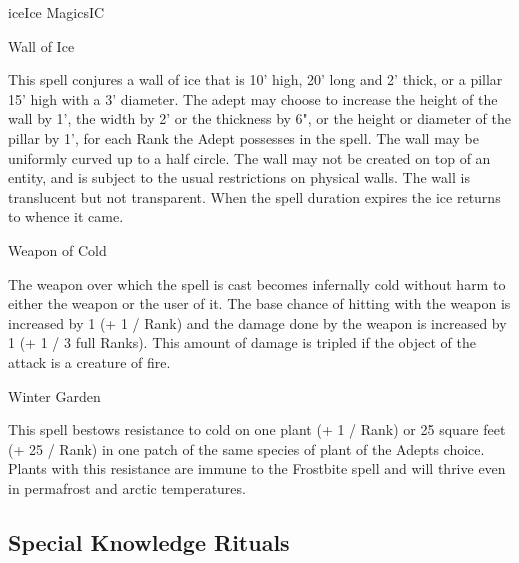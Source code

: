 \begin{college}[1.5]{ice}{Ice Magics}{IC}
\begin{spell}[S-15]{Wall of Ice}

\begin{effects}
This spell conjures a wall of ice that is 10' high, 20' long and 2'
thick, or a pillar 15' high with a 3' diameter.  The adept may choose
to increase the height of the wall by 1', the width by 2' or the
thickness by 6", or the height or diameter of the pillar by 1', for
each Rank the Adept possesses in the spell.  The wall may be uniformly
curved up to a half circle. The wall may not be created on top of an
entity, and is subject to the usual restrictions on physical walls.
The wall is translucent but not transparent.  When the spell duration
expires the ice returns to whence it came.
\end{effects}
\end{spell}

\begin{spell}[S-16]{Weapon of Cold}
\begin{effects}
The weapon over which the spell is cast becomes infernally cold
without harm to either the weapon or the user of it. The base chance
of hitting with the weapon is increased by 1 (+ 1 / Rank) and the
damage done by the weapon is increased by 1 (+ 1 / 3 full Ranks). This
amount of damage is tripled if the object of the attack is a creature
of fire.
\end{effects}
\end{spell}

\begin{spell}[S-17]{Winter Garden}

\begin{effects}
This spell bestows resistance to cold on one plant (+ 1 / Rank) or 25
square feet (+ 25 / Rank) in one patch of the same species of plant of
the Adepts choice. Plants with this resistance are immune to the
Frostbite spell and will thrive even in permafrost and arctic
temperatures.
\end{effects}
\end{spell}

\subsection{Special Knowledge Rituals}


\end{college}
